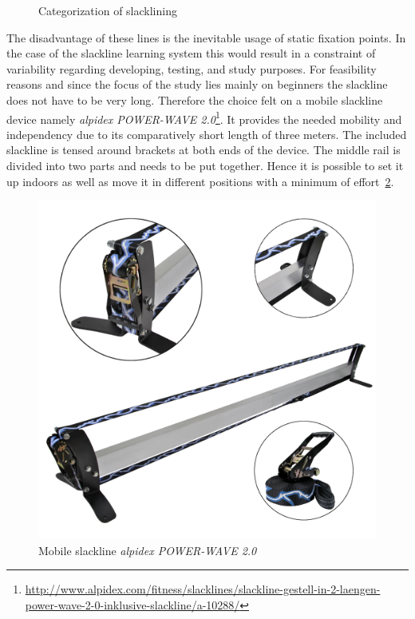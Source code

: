 \begin{figure}[htb]
\begin{minipage}[t]{0.45\linewidth}
		\label{fig:urbanline}
	\end{minipage}
	\caption{Categorization of slacklining}
	\label{fig:slacklineCategorization}
\end{figure}

The disadvantage of these lines is the inevitable usage of static fixation points. In the case of the slackline learning system this would result in a constraint of variability regarding developing, testing, and study purposes. For feasibility reasons and since the focus of the study lies mainly on beginners the slackline does not have to be very long. Therefore the choice felt on a mobile slackline device namely \textit{alpidex POWER-WAVE 2.0}\footnote{\url{http://www.alpidex.com/fitness/slacklines/slackline-gestell-in-2-laengen-power-wave-2-0-inklusive-slackline/a-10288/}}. It provides the needed mobility and independency due to its comparatively short length of three meters. The included slackline is tensed around brackets at both ends of the device. The middle rail is divided into two parts and needs to be put together. Hence it is possible to set it up indoors as well as move it in different positions with a minimum of effort~\ref{fig:3_2_mobileSlackline}.
\begin{figure}[htb]
	\centering
	\begin{minipage}[t]{1\linewidth}
		\centering
		\includegraphics[width=0.44\linewidth]{Pictures/3_2_mobileSlackline}
		\caption{Mobile slackline \textit{alpidex POWER-WAVE 2.0}~\cite{alpidex2017-ms}}
		\label{fig:3_2_mobileSlackline}
	\end{minipage}
\end{figure}

